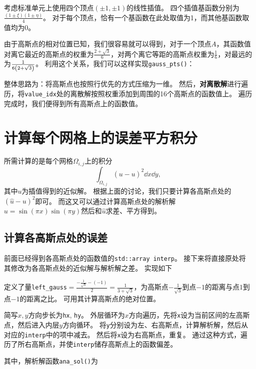 考虑标准单元上使用四个顶点$(\pm 1, \pm 1)$的线性插值。
四个插值基函数分别为$\frac{(1\pm\xi)(1\pm\eta)}{4}$。
对于每个顶点，恰有一个基函数在此处取值为1，而其他基函数取值均为0。

由于高斯点的相对位置已知，我们很容易就可以得到，对于一个顶点$A$，其函数值对离它最近的高斯点的权重为$\frac{2+\sqrt{3}}{6}$，对两个离它等距的高斯点权重为$\frac{1}{6}$，对最远的为$\frac{1}{6\qty(2+\sqrt{3})}$。
利用这个关系，我们可以这样实现\texttt{gauss\_pts()}：
{
    \linespread{1.0}
    
}
整体思路为：将高斯点也按照行优先的方式压缩为一维。
然后，\textbf{对离散解}进行遍历，将\texttt{value\_idx}处的离散解按照权重添加到周围的16个高斯点的函数值上。
遍历完成时，我们便得到所有高斯点上的函数值。

\section{计算每个网格上的误差平方积分}
所需计算的是每个网格$\Omega_{i, j}$上的积分
\begin{equation}
    \int_{\Omega_{i, j}}(\hat{u} − u)^2\dd{x}\dd{y},
\end{equation}
其中$\hat{u}$为插值得到的近似解。
根据上面的讨论，我们只要计算各高斯点处的$(\hat{u} − u)^2$即可。
而这又可以通过计算高斯点处的解析解$u=\sin(\pi x)\sin(\pi y)$然后和$\hat{u}$求差、平方得到。

\subsection{计算各高斯点处的误差}
前面已经得到各高斯点处的函数值的\texttt{std::array interp}。
接下来将直接原处将其修改为各高斯点处的近似解与解析解之差。
实现如下
{
    \linespread{1.0}
    
}
定义了量\texttt{left\_gauss}$=\frac{-\frac{1}{\sqrt{3}}-(-1)}{2}=\frac{1}{3+\sqrt{3}}$，为高斯点$-\frac{1}{\sqrt{3}}$到点$-1$的距离与点$1$到点$-1$的距离之比。
可用其计算高斯点的绝对位置。

简写$x,y$方向步长为\texttt{hx}, \texttt{hy}。
外层循环为$x$方向遍历，先将\texttt{x}设为当前区间的左高斯点，然后进入内层$y$方向循环。
将\texttt{y}分别设为左、右高斯点，计算解析解，然后从对应的\texttt{interp}中的项中减去。
然后将\texttt{x}设为右高斯点，重复。
通过这种方式，遍历了所右高斯点，并使\texttt{interp}储存高斯点上的函数偏差。

其中，解析解函数\texttt{ana\_sol()}为
{
    \linespread{1.0}
    
}

